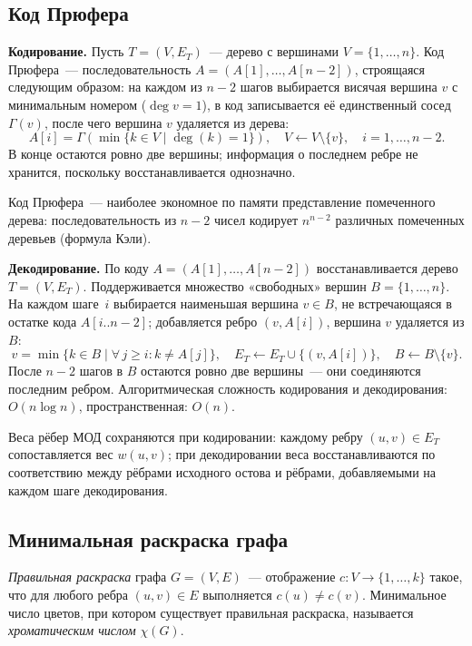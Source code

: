 \subsection{Код Прюфера}

\textbf{Кодирование.} Пусть $T = (V, E_T)$~--- дерево с вершинами
$V = \{1, \ldots, n\}$. Код Прюфера~--- последовательность
$A = (A[1], \ldots, A[n-2])$, строящаяся следующим образом:
на каждом из $n - 2$ шагов выбирается висячая вершина $v$ с минимальным
номером ($\deg v = 1$), в код записывается её единственный сосед
$\Gamma(v)$, после чего вершина $v$ удаляется из дерева:
\[
    A[i] = \Gamma\!\left(\min\{k \in V \mid \deg(k) = 1\}\right),
    \quad V \leftarrow V \setminus \{v\}, \quad i = 1, \ldots, n-2.
\]
В конце остаются ровно две вершины; информация о последнем ребре
не хранится, поскольку восстанавливается однозначно.

Код Прюфера~--- наиболее экономное по памяти представление помеченного
дерева: последовательность из $n - 2$ чисел кодирует $n^{n-2}$ различных
помеченных деревьев (формула Кэли).

\textbf{Декодирование.} По коду $A = (A[1], \ldots, A[n-2])$
восстанавливается дерево $T = (V, E_T)$. Поддерживается множество
«свободных» вершин $B = \{1, \ldots, n\}$.
На каждом шаге~$i$ выбирается наименьшая вершина $v \in B$, не
встречающаяся в остатке кода $A[i..n-2]$; добавляется ребро $(v, A[i])$,
вершина $v$ удаляется из $B$:
\[
    v = \min\{k \in B \mid \forall\, j \geq i : k \neq A[j]\},
    \quad E_T \leftarrow E_T \cup \{(v, A[i])\},
    \quad B \leftarrow B \setminus \{v\}.
\]
После $n - 2$ шагов в $B$ остаются ровно две вершины~--- они соединяются
последним ребром. Алгоритмическая сложность кодирования и декодирования:
$O(n \log n)$, пространственная: $O(n)$.

Веса рёбер МОД сохраняются при кодировании: каждому ребру
$(u, v) \in E_T$ сопоставляется вес $w(u, v)$; при декодировании
веса восстанавливаются по соответствию между рёбрами исходного
остова и рёбрами, добавляемыми на каждом шаге декодирования.

\subsection{Минимальная раскраска графа}

\textit{Правильная раскраска} графа $G = (V, E)$~--- отображение
$c : V \to \{1, \ldots, k\}$ такое, что для любого ребра $(u, v) \in E$
выполняется $c(u) \neq c(v)$. Минимальное число цветов, при котором
существует правильная раскраска, называется \textit{хроматическим числом}
$\chi(G)$.

